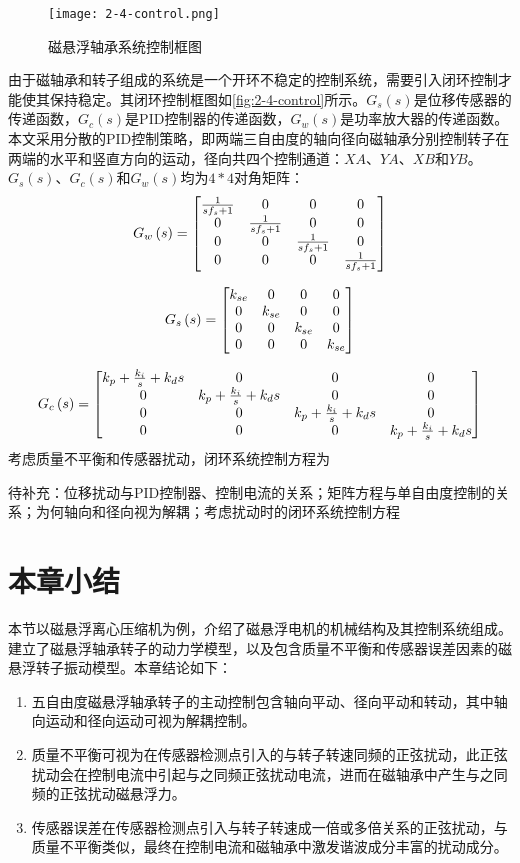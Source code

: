 \documentclass[
  lang=cn,
  degree=master,
  openany,oneside
]{nuaathesis}
\begin{document}
\begin{figure}[h!]
	\texttt{[image: 2-4-control.png]}
	\caption{磁悬浮轴承系统控制框图}
	\label{fig:2-4-control}
\end{figure}

由于磁轴承和转子组成的系统是一个开环不稳定的控制系统，需要引入闭环控制才能使其保持稳定。其闭环控制框图如\autoref{fig:2-4-control}所示。$G_s(s)$是位移传感器的传递函数，$G_c(s)$是PID控制器的传递函数，$G_w(s)$是功率放大器的传递函数。本文采用分散的PID控制策略，即两端三自由度的轴向径向磁轴承分别控制转子在两端的水平和竖直方向的运动，径向共四个控制通道：$XA$、$YA$、$XB$和$YB$。$G_s(s)$、$G_c(s)$和$G_w(s)$均为$4*4$对角矩阵：
$${G_w}\left( s \right) = \left[ 
{\begin{matrix}
   {{1 \over {s{f_s} + 1}}} & 0 & 0 & 0  \cr 
   0 & {{1 \over {s{f_s} + 1}}} & 0 & 0  \cr 
   0 & 0 & {{1 \over {s{f_s} + 1}}} & 0  \cr 
   0 & 0 & 0 & {{1 \over {s{f_s} + 1}}}  \cr 

 \end{matrix} }
\right]$$

$${G_s}\left( s \right) = \left[ 
{\begin{matrix}
   {{k_{se}}} & 0 & 0 & 0  \cr 
   0 & {{k_{se}}} & 0 & 0  \cr 
   0 & 0 & {{k_{se}}} & 0  \cr 
   0 & 0 & 0 & {{k_{se}}}  \cr 

 \end{matrix} } 
 \right]$$
 
$${G_c}\left( s \right) = \left[ {\begin{matrix}
   {{k_p} + {{{k_i}} \over s} + {k_d}s} & 0 & 0 & 0  \cr 
   0 & {{k_p} + {{{k_i}} \over s} + {k_d}s} & 0 & 0  \cr 
   0 & 0 & {{k_p} + {{{k_i}} \over s} + {k_d}s} & 0  \cr 
   0 & 0 & 0 & {{k_p} + {{{k_i}} \over s} + {k_d}s}  \cr 

 \end{matrix} } \right]$$
考虑质量不平衡和传感器扰动，闭环系统控制方程为

待补充：位移扰动与PID控制器、控制电流的关系；矩阵方程与单自由度控制的关系；为何轴向和径向视为解耦；考虑扰动时的闭环系统控制方程

\section{本章小结}
本节以磁悬浮离心压缩机为例，介绍了磁悬浮电机的机械结构及其控制系统组成。建立了磁悬浮轴承转子的动力学模型，以及包含质量不平衡和传感器误差因素的磁悬浮转子振动模型。本章结论如下：
\begin{enumerate}
\item 五自由度磁悬浮轴承转子的主动控制包含轴向平动、径向平动和转动，其中轴向运动和径向运动可视为解耦控制。
\item 质量不平衡可视为在传感器检测点引入的与转子转速同频的正弦扰动，此正弦扰动会在控制电流中引起与之同频正弦扰动电流，进而在磁轴承中产生与之同频的正弦扰动磁悬浮力。
\item 传感器误差在传感器检测点引入与转子转速成一倍或多倍关系的正弦扰动，与质量不平衡类似，最终在控制电流和磁轴承中激发谐波成分丰富的扰动成分。
\end{enumerate}
\end{document}
